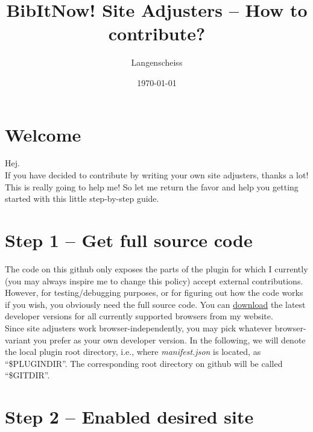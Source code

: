 \documentclass[
a4paper,
12pt,
]
{article}
\begin{document}
\newcommand{\plgdir}{\$PLUGINDIR}
\newcommand{\gitdir}{\$GITDIR}
\newcommand{\tmpl}{0\_TEMPLATE.js}
\newcommand{\exmpl}{0\_EXAMPLE.js}
\newcommand{\pathbox}[1]{\begin{center}\colorbox{light-gray}{#1}\end{center}}
\newcommand{\App}[1]{App.~\ref{#1}}
\newcommand{\Sec}[1]{Sec.~\ref{#1}}
\newcommand{\plgname}{\textbf{BibItNow!}}

\title{{\plgname} Site Adjusters -- How to contribute?}
\date{\today}
\author{Langenscheiss}
\maketitle

\section*{Welcome}

Hej.\\
If you have decided to contribute by writing your own site adjusters, thanks a lot! This is really going to help me! So let me return the favor and help you getting started with this little step-by-step guide.

\section{Step 1 -- Get full source code}\label{sec_1}

The code on this github only exposes the parts of the plugin for which I currently (you may always inspire me to change this policy) accept external contributions. However, for testing/debugging purposes, or for figuring out how the code works if you wish, you obviously need the full source code. You can \href{https://aqpl.mc2.chalmers.se/PDSU/files/BibItNowMultiBrowser.zip}{download} the latest developer versions for all currently supported browsers from my website.\\
Since site adjusters work browser-independently, you may pick whatever browser-variant you prefer as your own developer version. In the following, we will denote the local plugin root directory, i.e., where \textit{manifest.json} is located, as ``\plgdir''. The corresponding root directory on github will be called ``\gitdir''.

\section{Step 2 -- Enabled desired site}\label{sec_2}
\end{document}
